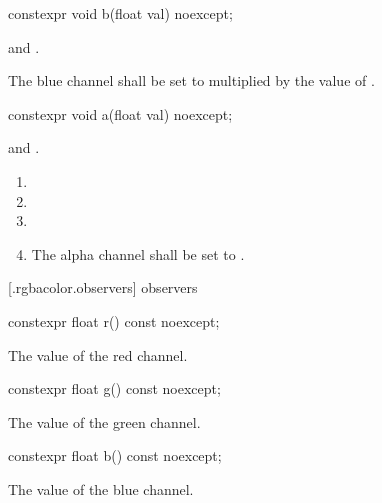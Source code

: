 \begin{itemdecl}
constexpr void b(float val) noexcept;
\end{itemdecl}
\begin{itemdescr}
\pnum
\requires
{} and .

\pnum
\effects
The blue channel shall be set to  multiplied by the value of  .
\end{itemdescr}

\begin{itemdecl}
constexpr void a(float val) noexcept;
\end{itemdecl}
\begin{itemdescr}
\pnum
\requires
{} and .

\pnum
\effects
\begin{enumerate}
\item {}
\item {}
\item {}
\item The alpha channel shall be set to .
\end{enumerate}
\end{itemdescr}

 [\iotwod.rgbacolor.observers]{ observers}

\begin{itemdecl}
constexpr float r() const noexcept;
\end{itemdecl}
\begin{itemdescr}
\pnum
\returns
The value of the red channel.
\end{itemdescr}

\begin{itemdecl}
constexpr float g() const noexcept;
\end{itemdecl}
\begin{itemdescr}
\pnum
\returns
The value of the green channel.
\end{itemdescr}

\begin{itemdecl}
constexpr float b() const noexcept;
\end{itemdecl}
\begin{itemdescr}
\pnum
\returns
The value of the blue channel.
\end{itemdescr}

